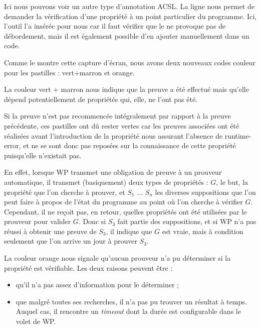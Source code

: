 \documentclass[middle]{zmdocument}
\begin{document}
Ici nous pouvons voir un autre type d'annotation ACSL. La 
ligne  nous permet de demander la vérification 
d'une propriété à un point particulier du programme. Ici, l'outil l'a 
insérée pour nous car il faut vérifier que le  ne provoque pas de 
débordement, mais il est également possible d'en ajouter manuellement dans 
un code.



Comme le montre cette capture d'écran, nous avons deux nouveaux codes couleur
pour les pastilles : vert+marron et orange.



La couleur vert + marron nous indique que la preuve a été effectué mais 
qu'elle dépend potentiellement de propriétés qui, elle, ne l'ont pas été.



Si  la preuve n'est pas recommencée intégralement par rapport à la preuve 
précédente, ces pastilles ont dû rester vertes car les preuves associées ont
été réalisées avant l'introduction de la propriété nous assurant l'absence 
de runtime-error, et ne se sont donc pas reposées sur la connaissance de cette
propriété puisqu'elle n'existait pas.



En effet, lorsque WP transmet une obligation de preuve à un prouveur automatique,
il transmet (basiquement) deux types de propriétés : $G$, le but, la propriété 
que l'on cherche à prouver, et $S_1$ ... $S_n$ les diverses suppositions que l'on
peut faire à propos de l'état du programme au point où l'on cherche à vérifier $G$.
Cependant, il ne reçoit pas, en retour, quelles propriétés ont été utilisées par
le prouveur pour valider $G$. Donc si $S_3$ fait partie des suppositions, et si
WP n'a pas réussi à obtenir une preuve de $S_3$, il indique que $G$ est vraie, mais
à condition seulement que l'on arrive un jour à prouver $S_3$.



La couleur orange nous signale qu'aucun prouveur n'a pu déterminer si la 
propriété est vérifiable. Les deux raisons peuvent être :



\begin{itemize}
\item qu'il n'a pas assez d'information pour le déterminer ;
\item que malgré toutes ses recherches, il n'a pas pu trouver un résultat à 
temps. Auquel cas, il rencontre un \textit{timeout} dont la durée est configurable 
dans le volet de WP.
\end{itemize}
\end{document}
